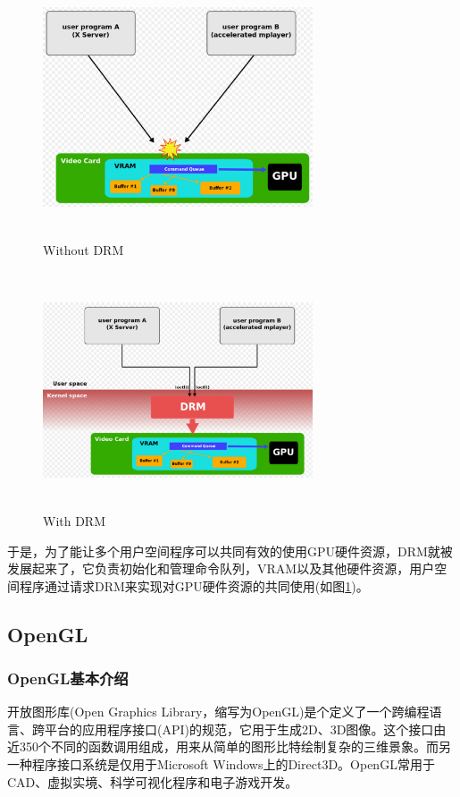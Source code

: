 \begin{figure}[H] 
  \begin{minipage}[t]{0.5\linewidth}
  \includegraphics[width=8cm,height=7cm,center]{figures/chap01/without-drm}
  \caption{Without DRM}
  \label{fig:without-drm}
  \end{minipage}
  \begin{minipage}[t]{0.5\linewidth}
  \includegraphics[width=8cm,height=7cm,center]{figures/chap01/with-drm}
  \caption{With DRM}
  \label{fig:with-drm}
  \end{minipage}
\end{figure}

于是，为了能让多个用户空间程序可以共同有效的使用GPU硬件资源，DRM就被发展起来了，它负责初始化和管理命令队列，VRAM以及其他硬件资源，用户空间程序通过请求DRM来实现对GPU硬件资源的共同使用(如图\ref{fig:with-drm})。

\subsection{OpenGL}

\subsubsection{OpenGL基本介绍}
开放图形库(Open Graphics Library，缩写为OpenGL)是个定义了一个跨编程语言、跨平台的应用程序接口(API)的规范，它用于生成2D、3D图像\cite{SuperBible}。这个接口由近350个不同的函数调用组成，用来从简单的图形比特绘制复杂的三维景象。而另一种程序接口系统是仅用于Microsoft Windows上的Direct3D。OpenGL常用于CAD、虚拟实境、科学可视化程序和电子游戏开发。

